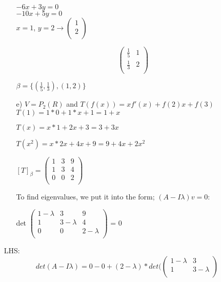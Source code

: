 \documentclass[12pt]{article}
\begin{document}
\begin{enumerate}
\begin{enumerate}[label=(\alph*)]
            $-6x + 3y = 0$ \\
            $-10x + 5y = 0$ \\

            $x = 1$, $y = 2 \xrightarrow{} \begin{pmatrix}
                1 \\
                2 \\
            \end{pmatrix}$

            \begin{equation}
                \begin{pmatrix}
                    \frac{1}{5} & 1 \\
                    \frac{1}{3} & 2 \\
                \end{pmatrix}
            \end{equation}

            $\beta = \{(\frac{1}{5}, \frac{1}{3}), (1,2) \}$
            
            \item[e)] $V = P_2(R)$ and $T(f(x)) = xf'(x) + f(2)x + f(3)$
            $T(1) = 1 * 0 + 1 * x + 1 = 1 + x$

            $T(x) = x * 1 + 2x + 3 = 3 + 3x$

            $T(x^2) = x * 2x + 4x + 9 = 9 + 4x + 2x^2$

            $[T]_\beta = \begin{pmatrix}
                1 & 3 & 9 \\
                1 & 3 & 4 \\
                0 & 0 & 2 \\
            \end{pmatrix}$ 

            To find eigenvalues, we put it into the form; $(A - I\lambda)v = 0$: 

            det $\begin{pmatrix}
                1 - \lambda & 3 & 9 \\
                1 & 3 - \lambda & 4 \\
                0 & 0 & 2 - \lambda\\
            \end{pmatrix}$ = 0
        \end{enumerate}

        LHS:
        \begin{equation}
            det(A - I\lambda) = 0 - 0 + (2 - \lambda) * det(\begin{pmatrix}
                1 - \lambda & 3 \\
                1 & 3 - \lambda \\
            \end{pmatrix} 
        \end{equation}


\end{enumerate}
\end{document}
